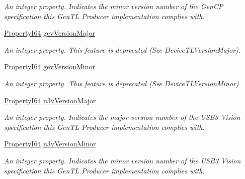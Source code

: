 \begin{DoxyCompactItemize}
\begin{DoxyCompactList}\small\item\em An integer property. Indicates the minor version number of the Gen\+C\+P specification this Gen\+T\+L Producer implementation complies with. \end{DoxyCompactList}\item 
\hyperlink{group___common_interface_ga81749b2696755513663492664a18a893}{Property\+I64} \hyperlink{classmv_i_m_p_a_c_t_1_1acquire_1_1_gen_i_cam_1_1_system_module_a71bc6f8eab54b687fb89575a0af7cf9f}{gev\+Version\+Major}
\begin{DoxyCompactList}\small\item\em An integer property. This feature is deprecated (See Device\+T\+L\+Version\+Major). \end{DoxyCompactList}\item 
\hyperlink{group___common_interface_ga81749b2696755513663492664a18a893}{Property\+I64} \hyperlink{classmv_i_m_p_a_c_t_1_1acquire_1_1_gen_i_cam_1_1_system_module_a743cf765f431c037b166db1a2f6ebe31}{gev\+Version\+Minor}
\begin{DoxyCompactList}\small\item\em An integer property. This feature is deprecated (See Device\+T\+L\+Version\+Minor). \end{DoxyCompactList}\item 
\hyperlink{group___common_interface_ga81749b2696755513663492664a18a893}{Property\+I64} \hyperlink{classmv_i_m_p_a_c_t_1_1acquire_1_1_gen_i_cam_1_1_system_module_a21d87726103ba795abd382f948688adc}{u3v\+Version\+Major}
\begin{DoxyCompactList}\small\item\em An integer property. Indicates the major version number of the U\+S\+B3 Vision specification this Gen\+T\+L Producer implementation complies with. \end{DoxyCompactList}\item 
\hyperlink{group___common_interface_ga81749b2696755513663492664a18a893}{Property\+I64} \hyperlink{classmv_i_m_p_a_c_t_1_1acquire_1_1_gen_i_cam_1_1_system_module_a09cc58892ace4b142df7c60594a326c9}{u3v\+Version\+Minor}
\begin{DoxyCompactList}\small\item\em An integer property. Indicates the minor version number of the U\+S\+B3 Vision specification this Gen\+T\+L Producer implementation complies with. \end{DoxyCompactList}\item 

\end{DoxyCompactItemize}
